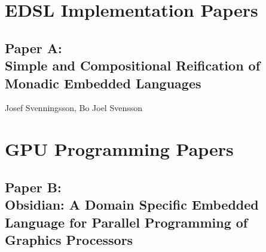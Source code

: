 \documentclass[a4paper]{book}
\newcommand{\paperA}{Paper A}
\newcommand{\paperATitle}{Simple and Compositional Reification of Monadic Embedded Languages}
\newcommand{\paperB}{Paper B}
\newcommand{\paperBTitle}{Obsidian: A Domain Specific Embedded Language for Parallel Programming of Graphics Processors}
\begin{document}




\clearpage{}

%
%


\chapter{EDSL Implementation Papers}
\label{chap:EDSLImplementation}
% 
\cleardoublepage 


\section[\paperATitle]{\paperA: \\ \paperATitle}
\label{sec:paperA}


\begin{center} 
Josef Svenningsson, Bo Joel Svensson
\end{center}






\chapter{GPU Programming Papers}
\label{chap:GPUProgramming}

% 
\cleardoublepage 

\section[\paperBTitle]{\paperB: \\ \paperBTitle}
\label{sec:paperB}
\end{document}
